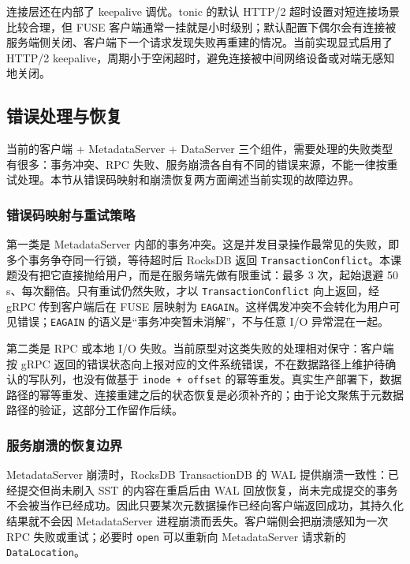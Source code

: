 连接层还在内部了 keepalive 调优。tonic 的默认 HTTP/2 超时设置对短连接场景比较合理，但 FUSE 客户端通常一挂就是小时级别；默认配置下偶尔会有连接被服务端侧关闭、客户端下一个请求发现失败再重建的情况。当前实现显式启用了 HTTP/2 keepalive，周期小于空闲超时，避免连接被中间网络设备或对端无感知地关闭。

\subsection{错误处理与恢复}
\label{sec:impl_error}

当前的客户端 + MetadataServer + DataServer 三个组件，需要处理的失败类型有很多：事务冲突、RPC 失败、服务崩溃各自有不同的错误来源，不能一律按重试处理。本节从错误码映射和崩溃恢复两方面阐述当前实现的故障边界。

\subsubsection{错误码映射与重试策略}

第一类是 MetadataServer 内部的事务冲突。这是并发目录操作最常见的失败，即多个事务争夺同一行锁，等待超时后 RocksDB 返回 \texttt{TransactionConflict}。本课题没有把它直接抛给用户，而是在服务端先做有限重试：最多 3 次，起始退避 50\,\textmu s、每次翻倍。只有重试仍然失败，才以 \texttt{TransactionConflict} 向上返回，经 gRPC 传到客户端后在 FUSE 层映射为 \texttt{EAGAIN}。这样偶发冲突不会转化为用户可见错误；\texttt{EAGAIN} 的语义是“事务冲突暂未消解”，不与任意 I/O 异常混在一起。

第二类是 RPC 或本地 I/O 失败。当前原型对这类失败的处理相对保守：客户端按 gRPC 返回的错误状态向上报对应的文件系统错误，不在数据路径上维护待确认的写队列，也没有做基于 \texttt{inode + offset} 的幂等重发。真实生产部署下，数据路径的幂等重发、连接重建之后的状态恢复是必须补齐的；由于论文聚焦于元数据路径的验证，这部分工作留作后续。

\subsubsection{服务崩溃的恢复边界}

MetadataServer 崩溃时，RocksDB TransactionDB 的 WAL 提供崩溃一致性：已经提交但尚未刷入 SST 的内容在重启后由 WAL 回放恢复，尚未完成提交的事务不会被当作已经成功。因此只要某次元数据操作已经向客户端返回成功，其持久化结果就不会因 MetadataServer 进程崩溃而丢失。客户端侧会把崩溃感知为一次 RPC 失败或重试；必要时 \texttt{open} 可以重新向 MetadataServer 请求新的 \texttt{DataLocation}。

